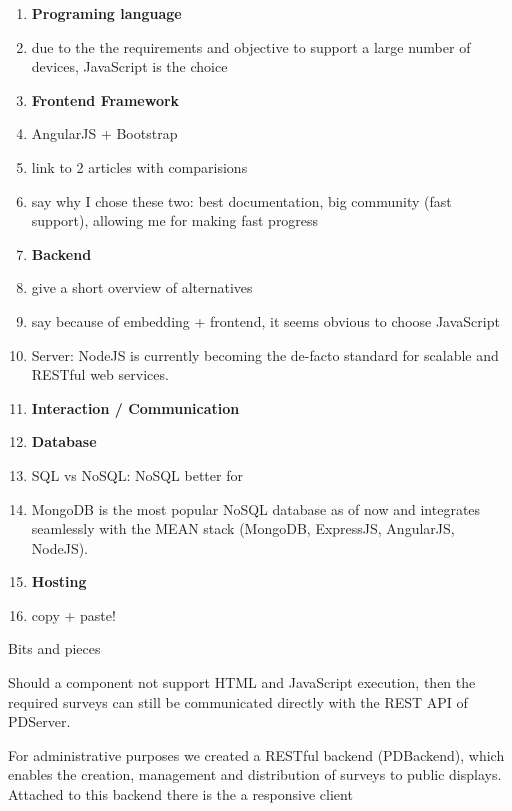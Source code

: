 	\begin{enumerate}
	\item \textbf{Programing language}
	\item due to the the requirements and objective to support a large number of devices, JavaScript is the choice


	\item \textbf{Frontend Framework}
	\item AngularJS + Bootstrap
	\item link to 2 articles with comparisions
	\item say why I chose these two: best documentation, big community (fast support), allowing me for making fast progress


	\item \textbf{Backend}
	\item give a short overview of alternatives
	\item say because of embedding + frontend, it seems obvious to choose JavaScript
	\item Server: NodeJS is currently becoming the de-facto standard for scalable and RESTful web services.


	\item \textbf{Interaction / Communication}
	
	\item \textbf{Database}
	\item SQL vs NoSQL: NoSQL better for 
	\item MongoDB is the most popular NoSQL database as of now and integrates seamlessly with the MEAN stack (MongoDB, ExpressJS, AngularJS, NodeJS).

	\item \textbf{Hosting}
	\item copy + paste!

	\end{enumerate}



Bits and pieces

		Should a component not support HTML and JavaScript execution, then the required surveys can still be communicated directly with the REST API of PDServer.

		For administrative purposes we created a RESTful backend (PDBackend), which enables the creation, management and distribution of surveys to public displays. Attached to this backend there is the   a responsive client 









